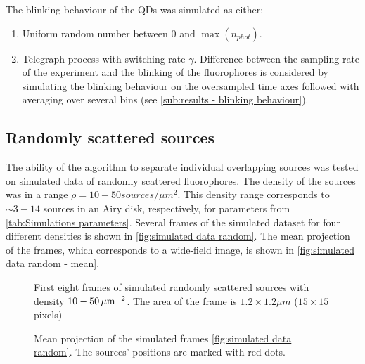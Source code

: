 The blinking behaviour of the QDs was simulated as either:
%
\begin{enumerate}
	\item
	Uniform random number between $0$ and $\max(n_{phot})$.
	\item
	Telegraph process with switching rate $\gamma$. Difference between the sampling rate of the experiment and the blinking of the fluorophores is considered by simulating the blinking behaviour on the oversampled time axes followed with averaging over several bins (see \autoref{sub:results - blinking behaviour}). 
\end{enumerate}
 
\subsection{Randomly scattered sources\label{sub:Simul random}}
The ability of the algorithm to separate individual overlapping sources was tested on simulated data of randomly scattered fluorophores. The density of the sources was in a range $\rho=10-50 \unit{sources/\mu m^{2}}$. This density range corresponds to $\sim 3-14$ sources in an Airy disk, respectively, for parameters from \autoref{tab:Simulations parameters}. Several frames of the simulated dataset for four different densities is shown in  \autoref{fig:simulated data random}. The mean projection of the frames, which corresponds to a wide-field image, is shown in \autoref{fig:simulated data random - mean}.

\begin{figure}[!htb]	
	\newcommand{\widthfig}{1\textwidth}
	\centering	
	
	
	\caption{First eight frames of simulated randomly scattered sources with density $10-50\, \mathrm{\mu m}^{-2}$. The area of the frame is $1.2\times1.2\unit{\mu m}$ ($15\times15$ pixels)}
	\label{fig:simulated data random}
\end{figure} 
%
\begin{figure}[!htb]	
	\newcommand{\widthfig}{.25\textwidth}
	\centering	
	\hspace{.3cm}	
	\hspace{.3cm}	
	\caption{Mean projection of the simulated frames \autoref{fig:simulated data random}. The sources' positions are marked with red dots.}
	\label{fig:simulated data random - mean}
\end{figure} 

